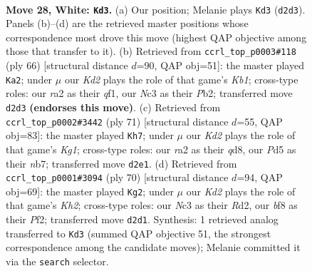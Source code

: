 \documentclass[11pt]{article}
\begin{document}
\clearpage

\begin{figure}[p]\centering
\begin{subfigure}{0.46\textwidth}\centering
\resizebox{\linewidth}{!}{%
\newchessgame
\chessboard[
  setfen={3qkb2/3R4/2Qn2p1/2pP4/4P3/1PN5/r2K4/8 w - - 0 28},
  showmover=false,
  pgfstyle=straightmove, color=movearrow, markmove={d2-d3}
]}
\caption{}
\end{subfigure}\hfill
\begin{subfigure}{0.46\textwidth}\centering
\resizebox{\linewidth}{!}{%
\newchessgame
\chessboard[
  setfen={r3k3/pp6/4P1nR/2Q1P3/8/P2P4/1P6/1K3q2 w q - 1 34},
  showmover=false,
  pgfstyle=straightmove, color=movearrow, markmove={b1-a2}
]}
\caption{}
\end{subfigure}
\\[4pt]
\begin{subfigure}{0.46\textwidth}\centering
\resizebox{\linewidth}{!}{%
\newchessgame
\chessboard[
  setfen={3Q2k1/1N4p1/4p2p/2n5/2P5/4q2P/6r1/6RK b - - 1 36},
  showmover=false,
  pgfstyle=straightmove, color=movearrow, markmove={g8-h7}
]}
\caption{}
\end{subfigure}\hfill
\begin{subfigure}{0.46\textwidth}\centering
\resizebox{\linewidth}{!}{%
\newchessgame
\chessboard[
  setfen={3r2k1/5p2/R3P1pQ/1p2q2n/8/8/3R1P1K/8 w - - 0 36},
  showmover=false,
  pgfstyle=straightmove, color=movearrow, markmove={h2-g2}
]}
\caption{}
\end{subfigure}
\caption{\textbf{Move 28, White: \texttt{Kd3}.} (a) Our position; Melanie plays \texttt{Kd3} (\texttt{d2d3}). Panels (b)--(d) are the retrieved master positions whose correspondence most drove this move (highest QAP objective among those that transfer to it). (b) Retrieved from \texttt{ccrl\_top\_p0003\#118} (ply 66) [structural distance $d$=90, QAP obj=51]: the master played \texttt{Ka2}; under $\mu$ our \emph{Kd2} plays the role of that game's \emph{Kb1}; cross-type roles: our \emph{r}a2 as their \emph{q}f1, our \emph{N}c3 as their \emph{P}b2; transferred move \texttt{d2d3} \textbf{(endorses this move)}. (c) Retrieved from \texttt{ccrl\_top\_p0002\#3442} (ply 71) [structural distance $d$=55, QAP obj=83]: the master played \texttt{Kh7}; under $\mu$ our \emph{Kd2} plays the role of that game's \emph{Kg1}; cross-type roles: our \emph{r}a2 as their \emph{q}d8, our \emph{P}d5 as their \emph{n}b7; transferred move \texttt{d2e1}. (d) Retrieved from \texttt{ccrl\_top\_p0001\#3094} (ply 70) [structural distance $d$=94, QAP obj=69]: the master played \texttt{Kg2}; under $\mu$ our \emph{Kd2} plays the role of that game's \emph{Kh2}; cross-type roles: our \emph{N}c3 as their \emph{R}d2, our \emph{b}f8 as their \emph{P}f2; transferred move \texttt{d2d1}. Synthesis: 1 retrieved analog transferred to \texttt{Kd3} (summed QAP objective 51, the strongest correspondence among the candidate moves); Melanie committed it via the \texttt{search} selector.}
\label{fig:thought-m54}
\end{figure}
\end{document}
